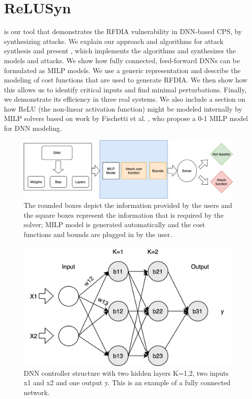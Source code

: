 \chapter{ReLUSyn}
\label{relusyn}
\tool is our tool that demonstrates the \ac{RFDIA} vulnerability in DNN-based \ac{CPS}, by synthesizing attacks.
We explain our approach and algorithms for attack synthesis and present \tool, which implements the algorithms and synthesizes the models and attacks. 
We show how fully connected, feed-forward \ac{DNN}s can be formulated as \ac{MILP} models. 
We use a generic representation and describe the modeling of cost functions that are used to generate \ac{RFDIA}.
We then show how this allows us to identify critical inputs and find minimal perturbations. 
Finally, we demonstrate its efficiency in three real systems. 
We also include a section on how ReLU (the non-linear activation function) might be modeled internally by MILP solvers based on work by Fischetti et al. \cite{fischetti2017deep}, who propose a 0-1 MILP model for \ac{DNN} modeling. 


\begin{figure}
	\centering
	\includegraphics[scale=0.1]{Images/Methodology}
	\caption[Methodology]{The rounded boxes depict the information provided by the users and the square boxes represent the information that is required by the solver; MILP model is generated automatically and the cost functions and bounds are plugged in by the user.}
	\label{fig:methodology}
\end{figure}

\begin{figure}
	\centering
	\includegraphics[width=0.7\linewidth]{Images/DNNstructure}
	\caption[DNN structure]{DNN controller structure with two hidden layers K=1,2, two inputs x1 and x2 and one output y. This is an example of a fully connected network.}
	\label{fig:dnn-controller}
\end{figure}



